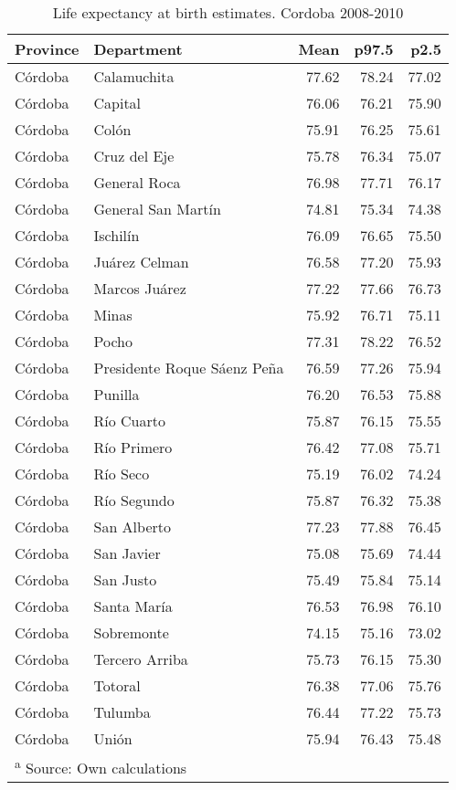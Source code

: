 \documentclass[12pt,]{article}
\begin{document}
\begin{table}

\caption{\label{tab:table_e0}Life expectancy at birth estimates. Cordoba 2008-2010}
\centering
\begin{tabular}[t]{l|l|r|r|r}
\hline
Province & Department & Mean & p97.5 & p2.5\\
\hline
Córdoba & Calamuchita & 77.62 & 78.24 & 77.02\\
\hline
Córdoba & Capital & 76.06 & 76.21 & 75.90\\
\hline
Córdoba & Colón & 75.91 & 76.25 & 75.61\\
\hline
Córdoba & Cruz del Eje & 75.78 & 76.34 & 75.07\\
\hline
Córdoba & General Roca & 76.98 & 77.71 & 76.17\\
\hline
Córdoba & General San Martín & 74.81 & 75.34 & 74.38\\
\hline
Córdoba & Ischilín & 76.09 & 76.65 & 75.50\\
\hline
Córdoba & Juárez Celman & 76.58 & 77.20 & 75.93\\
\hline
Córdoba & Marcos Juárez & 77.22 & 77.66 & 76.73\\
\hline
Córdoba & Minas & 75.92 & 76.71 & 75.11\\
\hline
Córdoba & Pocho & 77.31 & 78.22 & 76.52\\
\hline
Córdoba & Presidente Roque Sáenz Peña & 76.59 & 77.26 & 75.94\\
\hline
Córdoba & Punilla & 76.20 & 76.53 & 75.88\\
\hline
Córdoba & Río Cuarto & 75.87 & 76.15 & 75.55\\
\hline
Córdoba & Río Primero & 76.42 & 77.08 & 75.71\\
\hline
Córdoba & Río Seco & 75.19 & 76.02 & 74.24\\
\hline
Córdoba & Río Segundo & 75.87 & 76.32 & 75.38\\
\hline
Córdoba & San Alberto & 77.23 & 77.88 & 76.45\\
\hline
Córdoba & San Javier & 75.08 & 75.69 & 74.44\\
\hline
Córdoba & San Justo & 75.49 & 75.84 & 75.14\\
\hline
Córdoba & Santa María & 76.53 & 76.98 & 76.10\\
\hline
Córdoba & Sobremonte & 74.15 & 75.16 & 73.02\\
\hline
Córdoba & Tercero Arriba & 75.73 & 76.15 & 75.30\\
\hline
Córdoba & Totoral & 76.38 & 77.06 & 75.76\\
\hline
Córdoba & Tulumba & 76.44 & 77.22 & 75.73\\
\hline
Córdoba & Unión & 75.94 & 76.43 & 75.48\\
\hline
\multicolumn{5}{l}{\textsuperscript{a} Source: Own calculations}\\
\end{tabular}
\end{table}
\end{document}
